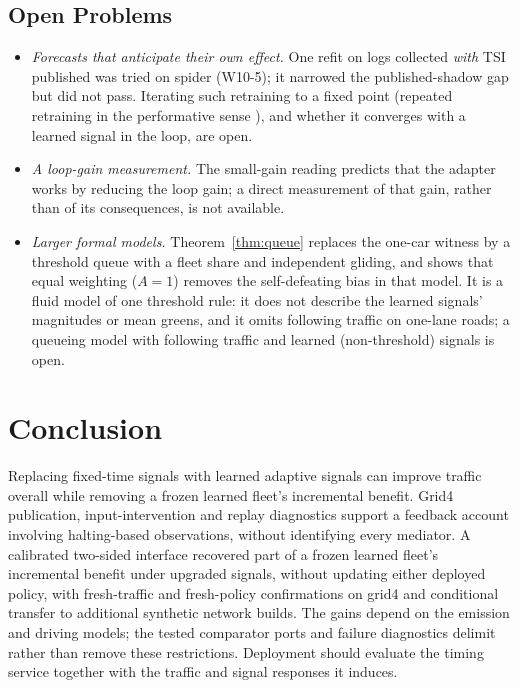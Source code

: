 \subsection{Open Problems}
\begin{itemize}\setlength\itemsep{1pt}
\item \emph{Forecasts that anticipate their own effect.} One refit on logs collected \emph{with} TSI published was tried on spider (W10-5); it
narrowed the published-shadow gap but did not pass. Iterating such retraining to a fixed point (repeated retraining in the performative
sense \cite{perdomo2020}), and whether it converges with a learned signal in the loop, are open.
\item \emph{A loop-gain measurement.} The small-gain reading predicts that the adapter works by reducing the loop gain; a direct
measurement of that gain, rather than of its consequences, is not available.
\item \emph{Larger formal models.} Theorem~\ref{thm:queue} replaces the one-car witness by a threshold queue with a fleet share and
independent gliding, and shows that equal weighting ($A=1$) removes the self-defeating bias in that model. It is a fluid model of one threshold rule:
it does not describe the learned signals' magnitudes or mean greens, and it omits following traffic on one-lane roads; a queueing model
with following traffic and learned (non-threshold) signals is open.
\end{itemize}

\section{Conclusion}\label{sec:conclusion}
Replacing fixed-time signals with learned adaptive signals can improve traffic overall while removing a frozen learned fleet's incremental
benefit. Grid4 publication, input-intervention and replay diagnostics support a feedback account involving halting-based observations,
without identifying every mediator. A calibrated two-sided interface recovered part of a frozen learned fleet's incremental benefit under
upgraded signals, without updating either deployed policy, with fresh-traffic and fresh-policy confirmations on grid4 and conditional
transfer to additional synthetic network builds. The gains depend on the emission and driving models; the tested comparator ports and
failure diagnostics delimit rather than remove these restrictions. Deployment should evaluate the timing service together with the
traffic and signal responses it induces.

